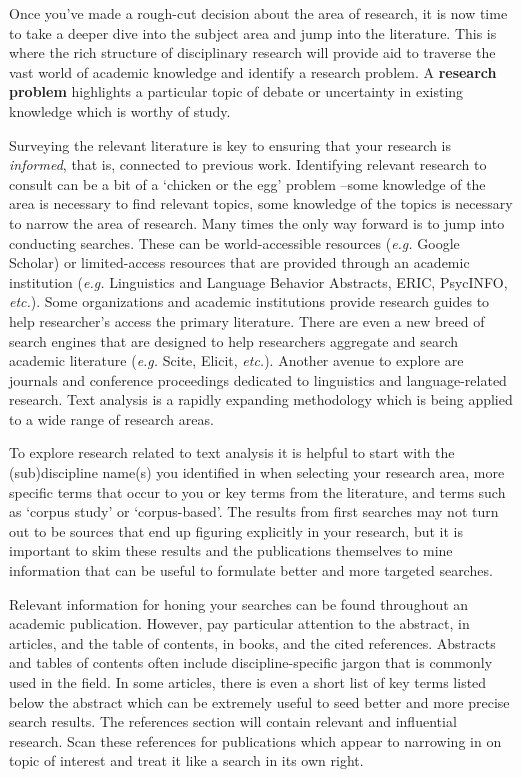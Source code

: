 \documentclass[
  letterpaper,
  krantz1]{latex/krantz-mod}
\theoremstyle{definition}
\theoremstyle{definition}
\theoremstyle{remark}
\begin{document}
Once you've made a rough-cut decision about the area of research, it is
now time to take a deeper dive into the subject area and jump into the
literature. This is where the rich structure of disciplinary research
will provide aid to traverse the vast world of academic knowledge and
identify a research problem. A \textbf{research problem} highlights a
particular topic of debate or uncertainty in existing knowledge which is
worthy of study.

Surveying the relevant literature is key to ensuring that your research
is \emph{informed}, that is, connected to previous work. Identifying
relevant research to consult can be a bit of a `chicken or the egg'
problem --some knowledge of the area is necessary to find relevant
topics, some knowledge of the topics is necessary to narrow the area of
research. Many times the only way forward is to jump into conducting
searches. These can be world-accessible resources (\emph{e.g.} Google
Scholar) or limited-access resources that are provided through an
academic institution (\emph{e.g.} Linguistics and Language Behavior
Abstracts, ERIC, PsycINFO, \emph{etc.}). Some organizations and academic
institutions provide research guides to help researcher's access the
primary literature. There are even a new breed of search engines that
are designed to help researchers aggregate and search academic
literature (\emph{e.g.} Scite, Elicit, \emph{etc.}). Another avenue to
explore are journals and conference proceedings dedicated to linguistics
and language-related research. Text analysis is a rapidly expanding
methodology which is being applied to a wide range of research areas.

To explore research related to text analysis it is helpful to start with
the (sub)discipline name(s) you identified in when selecting your
research area, more specific terms that occur to you or key terms from
the literature, and terms such as `corpus study' or `corpus-based'. The
results from first searches may not turn out to be sources that end up
figuring explicitly in your research, but it is important to skim these
results and the publications themselves to mine information that can be
useful to formulate better and more targeted searches.

Relevant information for honing your searches can be found throughout an
academic publication. However, pay particular attention to the abstract,
in articles, and the table of contents, in books, and the cited
references. Abstracts and tables of contents often include
discipline-specific jargon that is commonly used in the field. In some
articles, there is even a short list of key terms listed below the
abstract which can be extremely useful to seed better and more precise
search results. The references section will contain relevant and
influential research. Scan these references for publications which
appear to narrowing in on topic of interest and treat it like a search
in its own right.
\end{document}
